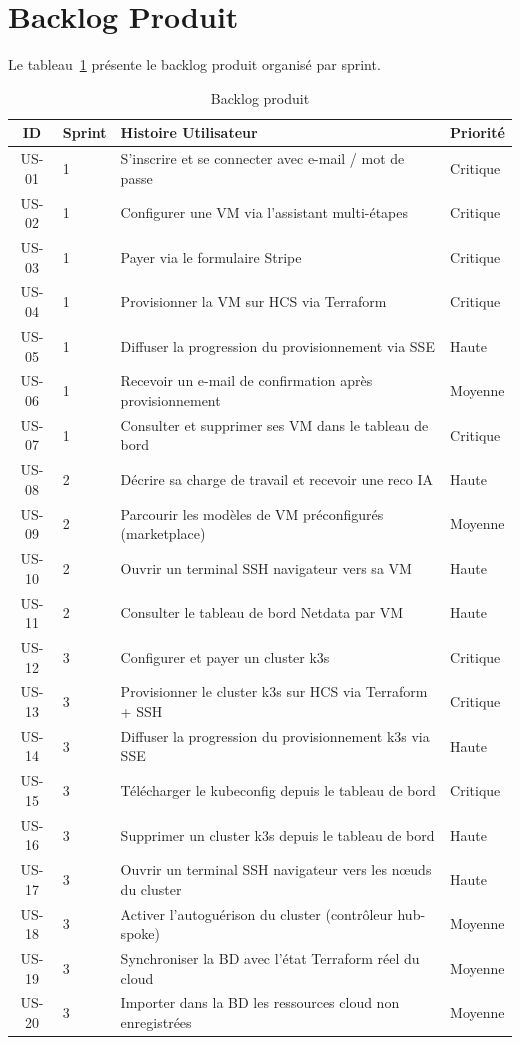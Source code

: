 \section{Backlog Produit}

Le tableau~\ref{tab:backlog} présente le backlog produit organisé par sprint.

\begin{table}[H]
\centering
\caption{Backlog produit}
\label{tab:backlog}
\begin{tabularx}{\linewidth}{clXl}
\toprule
\textbf{ID} & \textbf{Sprint} & \textbf{Histoire Utilisateur} & \textbf{Priorité} \\
\midrule
US-01 & 1 & S'inscrire et se connecter avec e-mail / mot de passe & Critique \\
US-02 & 1 & Configurer une VM via l'assistant multi-étapes & Critique \\
US-03 & 1 & Payer via le formulaire Stripe & Critique \\
US-04 & 1 & Provisionner la VM sur HCS via Terraform & Critique \\
US-05 & 1 & Diffuser la progression du provisionnement via SSE & Haute \\
US-06 & 1 & Recevoir un e-mail de confirmation après provisionnement & Moyenne \\
US-07 & 1 & Consulter et supprimer ses VM dans le tableau de bord & Critique \\
US-08 & 2 & Décrire sa charge de travail et recevoir une reco IA & Haute \\
US-09 & 2 & Parcourir les modèles de VM préconfigurés (marketplace) & Moyenne \\
US-10 & 2 & Ouvrir un terminal SSH navigateur vers sa VM & Haute \\
US-11 & 2 & Consulter le tableau de bord Netdata par VM & Haute \\
US-12 & 3 & Configurer et payer un cluster k3s & Critique \\
US-13 & 3 & Provisionner le cluster k3s sur HCS via Terraform + SSH & Critique \\
US-14 & 3 & Diffuser la progression du provisionnement k3s via SSE & Haute \\
US-15 & 3 & Télécharger le kubeconfig depuis le tableau de bord & Critique \\
US-16 & 3 & Supprimer un cluster k3s depuis le tableau de bord & Haute \\
US-17 & 3 & Ouvrir un terminal SSH navigateur vers les nœuds du cluster & Haute \\
US-18 & 3 & Activer l'autoguérison du cluster (contrôleur hub-spoke) & Moyenne \\
US-19 & 3 & Synchroniser la BD avec l'état Terraform réel du cloud & Moyenne \\
US-20 & 3 & Importer dans la BD les ressources cloud non enregistrées & Moyenne \\
\bottomrule
\end{tabularx}
\end{table}

